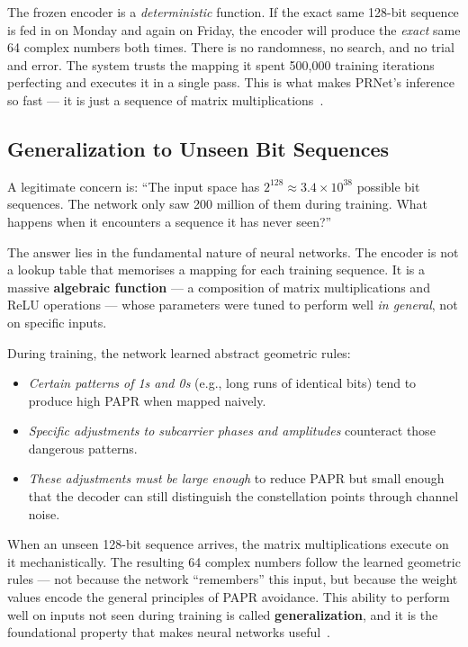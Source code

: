 \begin{keyinsight}
    The frozen encoder is a \emph{deterministic} function.  If the exact same 128-bit sequence is fed in on Monday and again on Friday, the encoder will produce the \emph{exact} same 64 complex numbers both times.  There is no randomness, no search, and no trial and error.  The system trusts the mapping it spent 500{,}000 training iterations perfecting and executes it in a single pass.  This is what makes PRNet's inference so fast --- it is just a sequence of matrix multiplications~\cite{kim2017novel}.
\end{keyinsight}


\subsection{Generalization to Unseen Bit Sequences}

A legitimate concern is: ``The input space has $2^{128} \approx 3.4 \times 10^{38}$ possible bit sequences.  The network only saw 200 million of them during training.  What happens when it encounters a sequence it has never seen?''

The answer lies in the fundamental nature of neural networks.  The encoder is not a lookup table that memorises a mapping for each training sequence. It is a massive \textbf{algebraic function} --- a composition of matrix multiplications and ReLU operations --- whose parameters were tuned to perform well \emph{in general}, not on specific inputs.

During training, the network learned abstract geometric rules:
\begin{itemize}
    \item \emph{Certain patterns of 1s and 0s} (e.g., long runs of identical bits) tend to produce high PAPR when mapped naively.
    \item \emph{Specific adjustments to subcarrier phases and amplitudes} counteract those dangerous patterns.
    \item \emph{These adjustments must be large enough} to reduce PAPR but small enough that the decoder can still distinguish the constellation points through channel noise.
\end{itemize}

When an unseen 128-bit sequence arrives, the matrix multiplications execute on it mechanistically.  The resulting 64 complex numbers follow the learned geometric rules --- not because the network ``remembers'' this input, but because the weight values encode the general principles of PAPR avoidance. This ability to perform well on inputs not seen during training is called \textbf{generalization}, and it is the foundational property that makes neural networks useful~\cite{kim2017novel}.


